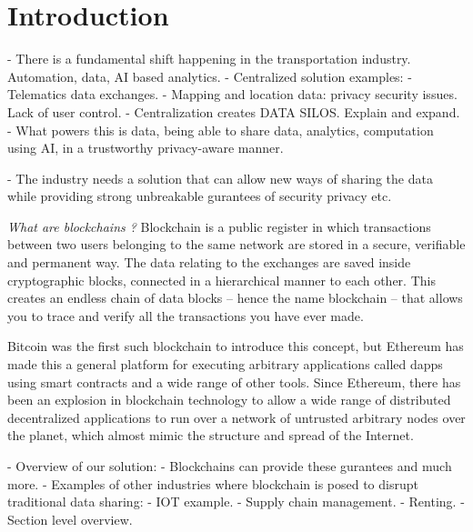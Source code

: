 \section{Introduction}\label{sec:intro}

- There is a fundamental shift happening in the transportation industry. Automation, data, AI based analytics.
- Centralized solution examples:
    - Telematics data exchanges.
    - Mapping and location data: privacy security issues. Lack of user control.
    - Centralization creates DATA SILOS. Explain and expand.
- What powers this is data, being able to share data, analytics, computation using AI, in a trustworthy privacy-aware
manner.

- The industry needs a solution that can allow new ways of sharing the data while providing strong unbreakable gurantees
of security privacy etc.

{\em What are blockchains ?}
Blockchain is a public register in which transactions between two users belonging to the same network are stored in a secure, verifiable
and permanent way. The data relating to the exchanges are saved inside cryptographic blocks, connected in a hierarchical
manner to each other. This creates an endless chain of data blocks -- hence the name blockchain -- that allows you to
trace and verify all the transactions you have ever made.

Bitcoin was the first such blockchain to introduce this concept, but Ethereum has made this a general platform for
executing arbitrary applications called dapps using smart contracts and a wide range of other tools. Since Ethereum,
there has been an explosion in blockchain technology to allow a wide range of distributed decentralized applications to
run over a network of untrusted arbitrary nodes over the planet, which almost mimic the structure and spread of the
Internet.

- Overview of our solution:
  - Blockchains can provide these gurantees and much more. 
  - Examples of other industries where blockchain is posed to disrupt traditional data sharing:
    - IOT example.
    - Supply chain management.
    - Renting.
  - Section level overview.



